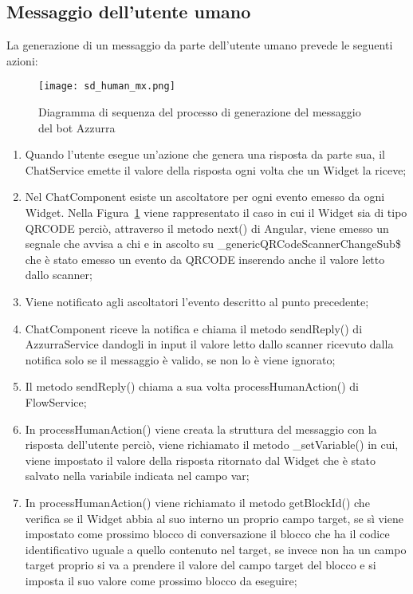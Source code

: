 \subsection{Messaggio dell’utente  umano}
La generazione di un messaggio da parte dell’utente umano prevede le seguenti azioni:\\
\begin{figure}[htbp]
	\centering
	\texttt{[image: sd\_human\_mx.png]}
	\caption{Diagramma di sequenza del processo di generazione del messaggio del bot Azzurra}\label{fig:mxHuman}
\end{figure}
\begin{enumerate}
	\item Quando l'utente esegue un'azione che genera una risposta da parte sua, il ChatService emette il valore della risposta ogni volta che un Widget la riceve;
	\item Nel ChatComponent esiste un ascoltatore per ogni evento emesso da ogni Widget. Nella Figura~\ref{fig:mxHuman} viene rappresentato il caso in cui il Widget sia di tipo QRCODE perciò, attraverso il metodo next() di Angular, viene emesso un segnale che avvisa a chi e in ascolto su  \_genericQRCodeScannerChangeSub\$ che è stato emesso un evento da QRCODE inserendo anche il valore letto dallo scanner;
	\item Viene notificato agli ascoltatori l'evento descritto al punto precedente;
	\item ChatComponent riceve la notifica e chiama il metodo sendReply() di AzzurraService dandogli in input il valore letto dallo scanner ricevuto dalla notifica solo se il messaggio è valido, se non lo è viene ignorato;	
	\item Il metodo sendReply() chiama a sua volta processHumanAction() di FlowService;
	\item In processHumanAction() viene creata la struttura del messaggio con la risposta dell'utente perciò, viene richiamato il metodo \_setVariable() in cui, viene impostato il valore della risposta ritornato dal Widget che è stato salvato nella variabile indicata nel campo var;
	\item In processHumanAction() viene richiamato il metodo getBlockId() che verifica se il Widget abbia al suo interno un proprio campo target, se sì viene impostato come prossimo blocco di conversazione il blocco che ha il codice identificativo uguale a quello contenuto nel target, se invece non ha un campo target proprio si va a prendere il valore del campo target del blocco e si imposta il suo valore come prossimo blocco da eseguire;

\end{enumerate}
